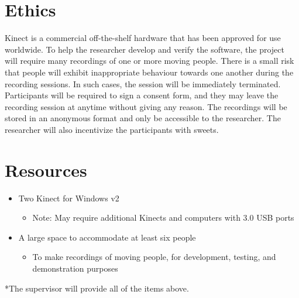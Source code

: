 \documentclass[paper=a4, fontsize=11pt]{scrartcl}
\numberwithin{equation}{section}
\numberwithin{figure}{section}
\numberwithin{table}{section}
\begin{document}
\section{Ethics}

Kinect is a commercial off-the-shelf hardware that has been approved for use worldwide. To help the researcher develop and verify the software, the project will require many recordings of one or more moving people. There is a small risk that people will exhibit inappropriate behaviour towards one another during the recording sessions. In such cases, the session will be immediately terminated. Participants will be required to sign a consent form, and they may leave the recording session at anytime without giving any reason. The recordings will be stored in an anonymous format and only be accessible to the researcher. The researcher will also incentivize the participants with sweets.

\section{Resources}

\begin{itemize}[topsep=0pt,itemsep=0ex,partopsep=1ex,parsep=1ex]
	\item Two Kinect for Windows v2
		\begin{itemize}[topsep=0pt,itemsep=0ex,partopsep=1ex,parsep=1ex]
			\item Note: May require additional Kinects and computers with 3.0 USB ports
		\end{itemize}
	\item A large space to accommodate at least six people
		\begin{itemize}[topsep=0pt,itemsep=0ex,partopsep=1ex,parsep=1ex]
			\item To make recordings of moving people, for development, testing, and demonstration purposes
		\end{itemize}
\end{itemize}

*The supervisor will provide all of the items above.



\end{document}
